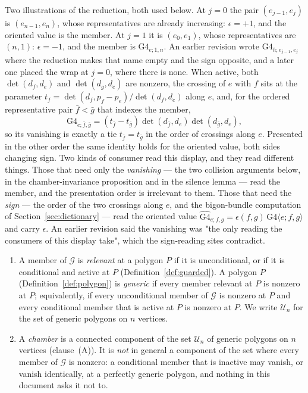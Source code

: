 \begin{definition}
\begin{enumerate}
Two illustrations of the reduction, both used below. At $j=0$ the pair
$(e_{j-1},e_j)$ is $(e_{n-1},e_n)$, whose representatives are already
increasing: $\epsilon=+1$, and the oriented value is the member. At $j=1$ it is
$(e_0,e_1)$, whose representatives are $(n,1)$: $\epsilon=-1$, and the member
is $\mathrm{G4}_{e;1,n}$. An earlier revision wrote
$\mathrm{G4}_{h;e_{j-1},e_j}$ where the reduction makes that name empty and the
sign opposite, and a later one placed the wrap at $j=0$, where there is none. When active, both
$\det(d_f,d_e)$ and $\det(d_g,d_e)$ are nonzero, the crossing of $e$ with $f$
sits at the parameter $t_f=\det(d_f,p_f-p_e)/\det(d_f,d_e)$ along $e$, and, for
the ordered representative pair $\bar f<\bar g$ that indexes the member,
\[
   \mathrm{G4}_{e;\bar f,\bar g}
      =(t_{\bar f}-t_{\bar g})\det(d_{\bar f},d_e)\det(d_{\bar g},d_e),
\]
so its vanishing is exactly a tie $t_{\bar f}=t_{\bar g}$ in the order of
crossings along $e$. Presented in the other order the same identity holds for the oriented value,
both sides changing sign. Two kinds of consumer read this display, and they read
different things. Those that need only the \emph{vanishing} --- the two collision arguments
below, in the chamber-invariance proposition and in the silence lemma --- read
the member, and the presentation order is irrelevant to them. Those that
need the \emph{sign} --- the order of the two crossings along $e$, and the
bigon-bundle computation of Section~\ref{sec:dictionary} --- read the oriented
value $\widehat{\mathrm{G4}}_{e;f,g}=\epsilon(f,g)\,\mathrm{G4}\langle
e;f,g\rangle$ and carry $\epsilon$. An earlier revision said the vanishing was
"the only reading the consumers of this display take", which the sign-reading
sites contradict.
\end{enumerate}
\end{definition}

\begin{definition}\label{def:generic}
\begin{enumerate}
\item[(A)] A member of $\mathcal G$ is \emph{relevant} at a polygon $P$ if it is
unconditional, or if it is conditional and active at $P$
(Definition~\ref{def:guarded}). A polygon $P$
(Definition~\ref{def:polygon}) is \emph{generic} if every member relevant at
$P$ is nonzero at $P$; equivalently, if every unconditional member of
$\mathcal G$ is nonzero at $P$ and every conditional member that is active at
$P$ is nonzero at $P$. We write $\mathcal U_n$ for the set of generic polygons
on $n$ vertices.

\item[(B)] A \emph{chamber} is a connected component of the set $\mathcal U_n$ of generic
polygons on $n$ vertices (clause~(A)). It is \emph{not} in
general a component of the set where every member of $\mathcal G$ is nonzero:
a conditional member that is inactive may vanish, or vanish identically, at a
perfectly generic polygon, and nothing in this document asks it not to.
\end{enumerate}
\end{definition}

